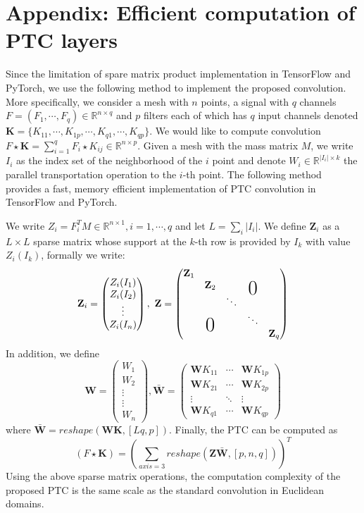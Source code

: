 \documentclass[10pt,twocolumn,letterpaper]{article}
\def\RR{\mathbb{R}}
\newcommand\bigzero{\makebox(0,0){\text{\huge0}}}
\begin{document}
\section*{Appendix: Efficient computation of PTC layers}
Since the limitation of spare matrix product implementation in TensorFlow and PyTorch, we use the following method to implement the proposed convolution. More specifically, we consider a mesh with $n$ points, a signal with $q$ channels $F = (F_1,\cdots,F_q)\in\RR^{n\times q}$ and $p$ filters  each of which has $q$ input channels denoted $\textbf{K} = \{K_{11},\cdots,K_{1p},\cdots,K_{q1},\cdots,K_{qp}\}$. We would like to compute convolution $F\star \textbf{K} =  \sum_{i=1}^{q} F_i \star K_{ij} \in\RR^{n\times p}$. Given a mesh with the mass matrix $M$, we write $I_i$ as the index set of the neighborhood of the $i$ point and denote $W_i\in \RR^{|I_i| \times k}$ the parallel transportation operation to the $i$-th point. 
The following method provides a fast, memory efficient implementation of PTC convolution in TensorFlow and PyTorch. 

We write $Z_i = F_i ^T M \in \RR^{n\times 1} , i = 1,\cdots,q $  and let $L = \sum_{i}|I_i|$. We define $\textbf{Z}_i$ as a $L\times L$ sparse matrix whose support at the $k$-th row is provided by $I_k$ with value $Z_i(I_k)$, formally we write:
$$\textbf{Z}_i = \begin{pmatrix}
Z_i(I_1) \\
Z_i(I_2) \\ 
\vdots   \\  
Z_i(I_n) \\
\end{pmatrix},~
\textbf{Z}= 
\begin{pmatrix}
\textbf{Z}_1   & &   &  &   \\ 
& \textbf{Z}_2 & & \bigzero &  \\ 
& &\ddots  & &  \\ 
& \bigzero & & \ddots    &    \\ 
&  &  & &   \textbf{Z}_q
\end{pmatrix}
$$
In addition, we define
$$
\textbf{W} = 
\begin{pmatrix}
W_1 \\ 
W_2 \\ 
\vdots \\ 
\vdots \\
W_n 
\end{pmatrix}, 
\bar{\textbf{W}} = 
\begin{pmatrix}
\textbf{W}K_{11}   & \cdots &  \textbf{W}K_{1p} \\ 
\textbf{W}K_{21}      & \cdots &  \textbf{W}K_{2p} \\ 
\vdots          &                 \ddots    &   \vdots \\ 
 \textbf{W}K_{q1} & \cdots &  \textbf{W}K_{qp}
\end{pmatrix}$$
where $\bar{\textbf{W}} = reshape(\textbf{WK},[Lq,p])$. Finally, the PTC can be computed as 
$$
(F \star \textbf{K})= \left(\sum_{axis = 3} reshape(\textbf{Z}\bar{\textbf{W}},[p,n,q])\right)^T$$
Using the above sparse matrix operations, the computation complexity of the proposed PTC is the same scale as the standard convolution in Euclidean domains.  

{\small


}
\end{document}
